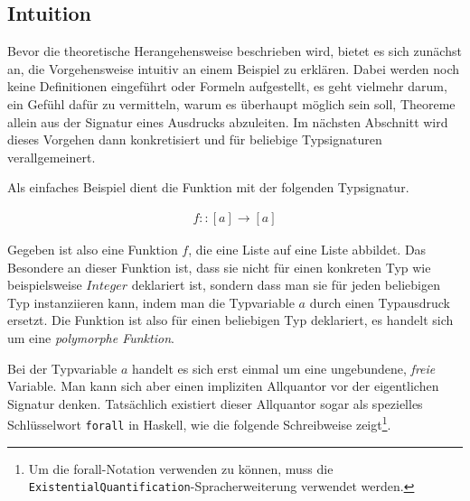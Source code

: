 \subsection{Intuition}

Bevor die theoretische Herangehensweise beschrieben wird, bietet es sich zunächst an, die Vorgehensweise intuitiv an einem
Beispiel zu erklären. Dabei werden noch keine Definitionen eingeführt oder Formeln aufgestellt, es geht vielmehr darum,
ein Gefühl dafür zu vermitteln, warum es überhaupt möglich sein soll, Theoreme allein aus der Signatur eines Ausdrucks
abzuleiten. Im nächsten Abschnitt wird dieses Vorgehen dann konkretisiert und für beliebige Typsignaturen verallgemeinert.

Als einfaches Beispiel dient die Funktion mit der folgenden Typsignatur.


\begin{align}
f :: [a] \rightarrow [a] \label{eq:fsig}
\end{align}

Gegeben ist also eine Funktion $f$, die eine Liste auf eine Liste abbildet. Das Besondere an dieser Funktion ist, dass sie
nicht für einen konkreten Typ wie beispielsweise $Integer$ deklariert ist, sondern dass man sie für jeden
beliebigen Typ instanziieren kann, indem man die Typvariable $a$ durch einen Typausdruck ersetzt. Die Funktion ist also für
einen beliebigen Typ deklariert, es handelt sich um eine \textit{polymorphe Funktion}.

Bei der Typvariable $a$ handelt es sich erst einmal um eine ungebundene, \textit{freie} Variable. Man kann sich aber einen impliziten
Allquantor vor der eigentlichen Signatur denken. Tatsächlich existiert dieser Allquantor sogar als spezielles Schlüsselwort \texttt{forall} in Haskell,
wie die folgende Schreibweise zeigt\footnote{Um die forall-Notation verwenden zu können, muss die \texttt{ExistentialQuantification}-Spracherweiterung verwendet werden.}.

